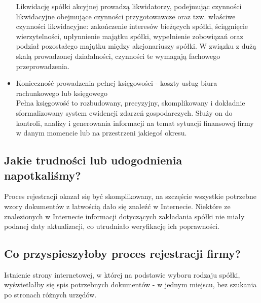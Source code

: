 \documentclass[a4paper, 11pt]{article}
\begin{document}
\begin{itemize}
Likwidację spółki akcyjnej prowadzą likwidatorzy, podejmując czynności likwidacyjne obejmujące czynności przygotowawcze oraz tzw. właściwe czynności likwidacyjne: zakończenie interesów bieżących spółki, ściągnięcie wierzytelności, upłynnienie majątku spółki, wypełnienie zobowiązań oraz podział pozostałego majątku między akcjonariuszy spółki. W związku z dużą skalą prowadzonej działalności, czynności te wymagają fachowego przeprowadzenia.
\item Konieczność prowadzenia pełnej księgowości - koszty usług biura rachunkowego lub księgowego\\

Pełna księgowość to rozbudowany, precyzyjny, skomplikowany i dokładnie sformalizowany system ewidencji zdarzeń gospodarczych. Służy on do kontroli, analizy i generowania informacji na temat sytuacji finansowej firmy w danym momencie lub na przestrzeni jakiegoś okresu.
\end{itemize}

\subsection{Jakie trudności lub udogodnienia napotkaliśmy?}
\indent

Proces rejestracji okazał się być skomplikowany, na szczęście wszystkie potrzebne wzory dokumentów z łatwością dało się znaleźć w Internecie. Niektóre ze znalezionych w Internecie informacji dotyczących zakładania spółki nie miały podanej daty aktualizacji, co utrudniało weryfikację ich poprawności.
\subsection{Co przyspieszyłoby proces rejestracji firmy?}
\indent

Istnienie strony internetowej, w której na podstawie wyboru rodzaju spółki, wyświetlałby się spis potrzebnych dokumentów - w jednym miejscu, bez szukania po stronach różnych urzędów. 
\end{document}
